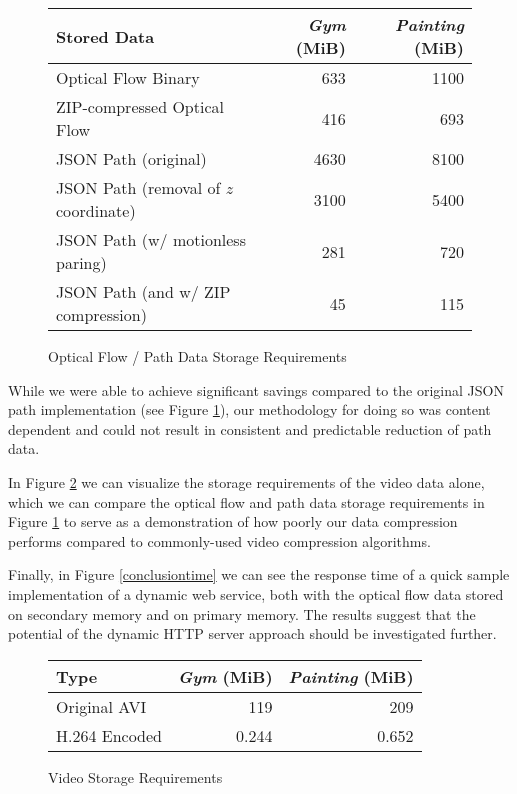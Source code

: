 \begin{figure}
\centering
\caption{Optical Flow / Path Data Storage Requirements}
\label{conclusionresults}
\begin{tabular}{l | r | r}
\textbf{Stored Data} & \textbf{\textit{Gym}} (MiB) & \textbf{\textit{Painting}} (MiB) \\
\hline
Optical Flow Binary & 633 & 1100 \\
ZIP-compressed Optical Flow & 416 & 693 \\
JSON Path (original) & 4630 & 8100 \\
JSON Path (removal of $z$ coordinate) & 3100 & 5400 \\
JSON Path (w/ motionless paring) & 281 & 720 \\
JSON Path (and w/ ZIP compression) & 45 & 115
\end{tabular}
\end{figure}

\par While we were able to achieve significant savings compared to the original JSON path implementation (see Figure \ref{conclusionresults}), our methodology for doing so was content dependent and could not result in consistent and predictable reduction of path data. 

\par In Figure \ref{conclusionvideo} we can visualize the storage requirements of the video data alone, which we can compare the optical flow and path data storage requirements in Figure \ref{conclusionresults} to serve as a demonstration of how poorly our data compression performs compared to commonly-used video compression algorithms.

\par Finally, in Figure \ref{conclusiontime} we can see the response time of a quick sample implementation of a dynamic web service, both with the optical flow data stored on secondary memory and on primary memory. The results suggest that the potential of the dynamic HTTP server approach should be investigated further.

\begin{figure}
\centering
\caption{Video Storage Requirements}
\label{conclusionvideo}
\begin{tabular}{l | r | r}
\textbf{Type} & \textbf{\textit{Gym}} (MiB) & \textbf{\textit{Painting}} (MiB) \\
\hline
Original AVI & 119 & 209 \\
H.264 Encoded & 0.244 & 0.652 \\
\end{tabular}
\end{figure}


